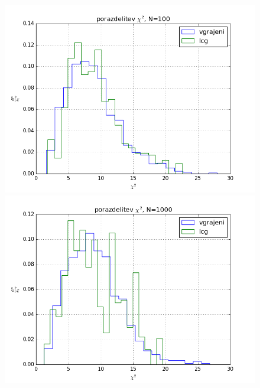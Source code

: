 \documentclass[slovene,11pt,a4paper]{article}
\numberwithin{equation}{section} %
\numberwithin{figure}{section} %
\numberwithin{table}{section} %
\begin{document}
\begin{figure}[h]
\centering
\begin{minipage}{0.4\textwidth}
\centering
\includegraphics[scale=0.4]{slike/potazdelitev_chi_N_100.png}
\end{minipage}\hfill
\begin{minipage}{0.4\textwidth}
\centering
\includegraphics[scale=0.4]{slike/potazdelitev_chi_N_1000.png}
\end{minipage}
\begin{minipage}{0.4\textwidth}
\centering

\end{minipage}
\end{figure}
\end{document}
